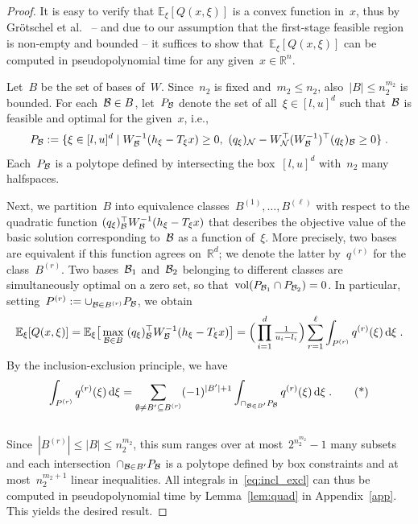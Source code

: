 \documentclass{article}
\newcommand{\R}{\mathbb{R}}
\newcommand{\E}{\mathbb{E}}
\newcommand{\B}{{\cal B}}
\newcommand{\NB}{{\cal N}}
\renewcommand{\d}{\,\textnormal{d}}
\DeclareMathOperator{\vol}{vol}
\begin{document}
\begin{proof}
  It is easy to verify that $\E_\xi[Q(x,\xi)]$ is a convex function
  in~$x$, thus by Grötschel et al.~\cite[Theorem~4.3.13]{Grotschel93}
  -- and due to our assumption that the first-stage feasible region is
  non-empty and bounded -- it suffices to show that~$\E_\xi[Q(x,\xi)]$
  can be computed in pseudopolynomial time for any given~$x\in\R^n$.

  Let~$B$ be the set of bases of~$W$. Since~$n_2$ is fixed and~$m_2\le
  n_2$, also~$|B|\le n_2^{m_2}$ is bounded. For each~$\B\in B$,
  let~$P_\B$ denote the set of all~$\xi\in[l,u]^d$ such that~$\B$ is
  feasible and optimal for the given~$x$, i.e.,
  \[
  P_\B:=\{\xi\in [l,u]^d\mid W_\B^{-1}(h_\xi-T_\xi x)\ge
  0,~(q_\xi)_\NB-W_\NB^\top (W_\B^{-1})^\top(q_\xi)_\B\ge 0\}\;.
  \]
  Each~$P_\B$ is a polytope defined by intersecting
  the box~$[l,u]^d$ with~$n_2$ many halfspaces.
  
  Next, we partition~$B$ into equivalence
  classes~$B^{(1)},\dots,B^{(\ell)}$ with respect to the quadratic
  function $(q_\xi)_{\B}^\top W_{\B}^{-1}(h_\xi-T_\xi x)$ that
  describes the objective value of the basic solution corresponding
  to~$\B$ as a function of~$\xi$. More precisely, two bases are
  equivalent if this function agrees on~$\R^d$; we denote the latter
  by~$q^{(r)}$ for the class~$B^{(r)}$. Two bases~$\B_1$ and~$\B_2$
  belonging to different classes are simultaneously optimal on a zero
  set, so that~$\vol(P_{\B_1}\cap P_{\B_2})=0$. In particular,
  setting~$P^{(r)}:=\cup_{\B\in B^{(r)}}P_{\B}$, we obtain
  \[
  \E_\xi[Q(x,\xi)] = \E_\xi\big[\max_{\B\in B}\;(q_\xi)_\B^\top W_\B^{-1}(h_\xi-T_\xi x)\big]
  = \Big(\prod_{i=1}^d\tfrac 1{u_i-l_i}\Big)\sum_{r=1}^\ell \int_{P^{(r)}} q^{(r)}(\xi) \d\xi\;.
  \]
  By the inclusion-exclusion principle, we have
  \begin{equation}
    \int_{P^{(r)}} q^{(r)}(\xi) \d\xi
    = \sum_{\emptyset\neq B'\subseteq B^{(r)}}(-1)^{|B'|+1}
    \int_{\cap_{\B\in B'} P_{\B}} q^{(r)}(\xi)\d\xi\;.\label{eq:incl_excl}\tag{*}
  \end{equation}\\[-1.5ex]
  Since~$|B^{(r)}|\le |B|\le n_2^{m_2}$, this sum ranges over at
  most~$2^{n_2^{m_2}}-1$ many subsets and each
  intersection~$\cap_{\B\in B'} P_{\B}$ is a polytope defined by box
  constraints and at most~$n_2^{m_2+1}$ linear inequalities. All
  integrals in~\eqref{eq:incl_excl} can thus be computed in
  pseudopolynomial time by Lemma~\ref{lem:quad} in
  Appendix~\ref{app}. This yields the desired result.
\end{proof}
\end{document}
